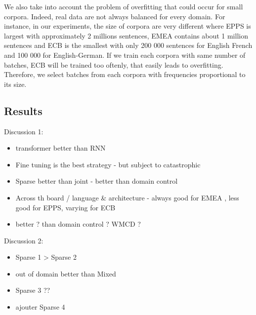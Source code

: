 \documentclass[11pt,a4paper]{article}
\newcommand{\fyTodo}[1]{\Todo[FY:]{\textcolor{orange}{#1}}}
\begin{document}
We also take into account the problem of overfitting that could occur for small corpora. Indeed, real data are not always balanced for every domain. For instance, in our experiments, the size of corpora are very different where EPPS is largest with approximately 2 millions sentences, EMEA contains about 1 million sentences and ECB is the smallest with only 200 000 sentences for English French and 100 000 for English-German. If we train each corpora with same number of batches, ECB will be trained too oftenly, that easily leads to overfitting. Therefore, we select batches from each corpora with frequencies proportional to its size. \fyTodo{Refs on this ? or contrast ?}

\subsection{Results}
Discussion 1:
\begin{itemize}
\item transformer better than RNN
\item Fine tuning is the best strategy - but subject to catastrophic
\item Sparse better than joint - better than domain control
\item Across th board / language \& architecture - always good for EMEA , less good for EPPS, varying for ECB
\item better ? than domain control ? WMCD ?
\end{itemize}

Discussion 2:
\begin{itemize}
\item Sparse 1 > Sparse 2
\item out of domain better than Mixed
\item Sparse 3 ??
\item ajouter Sparse 4
\end{itemize}
\end{document}
